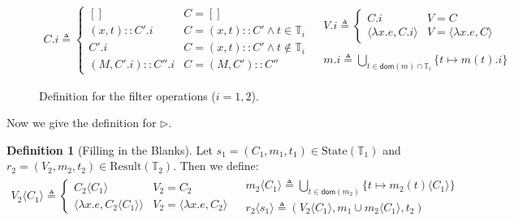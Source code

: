 \documentclass[acmsmall,review]{acmart}\settopmatter{printfolios=true,printccs=false,printacmref=false}
\theoremstyle{definition}
\newtheorem{definition}{Definition}[section]
\newcommand*{\cons}{::}
\newcommand*{\Time}{\mathbb{T}}
\newcommand*{\mem}{m}
\newcommand*{\State}{\text{State}}
\newcommand*{\Result}{\text{Result}}
\newcommand*{\inject}[2]{{#2}\langle{#1}\rangle}
\begin{document}
\begin{figure}[h!]
  \footnotesize
  \[
    \begin{array}{cc}
      C.i\triangleq
      \begin{cases}
        []                  & C=[]                                    \\
        (x,t)\cons C'.i     & C=(x,t)\cons C'\wedge t\in{\Time_i}     \\
        C'.i                & C=(x,t)\cons C'\wedge t\not\in{\Time_i} \\
        (M,C'.i)\cons C''.i & C=(M, C')\cons C''
      \end{cases} &
      \begin{array}{l}
        V.i\triangleq
        \begin{cases}
          C.i                           & V=C                           \\
          \langle\lambda x.e,C.i\rangle & V=\langle\lambda x.e,C\rangle
        \end{cases} \\ \\
        \mem.i\triangleq
        \displaystyle\bigcup_{t\in\mathsf{dom}(\mem)\cap\Time_i}\{t\mapsto \mem(t).i\}
      \end{array}
    \end{array}
  \]
  \caption{Definition for the filter operations ($i=1,2$).}
  \label{fig:concfilter}
\end{figure}

Now we give the definition for $\rhd$.
\begin{definition}[Filling in the Blanks]
  Let $s_1=(C_1,\mem_1,t_1)\in\State(\Time_1)$ and $r_2=(V_2,\mem_2,t_2)\in\Result(\Time_2)$. Then we define:
  \[
    \begin{array}{cc}
      \inject{C_1}{V_2}\triangleq
      \begin{cases}
        \inject{C_1}{C_2}                           & V_2=C_2                            \\
        \langle\lambda x.e,\inject{C_1}{C_2}\rangle & V_2=\langle\lambda x.e, C_2\rangle
      \end{cases} &
      \begin{array}{l}
        \inject{C_1}{\mem_2}\triangleq
        \displaystyle\bigcup_{t\in\mathsf{dom}(\mem_2)}\{t\mapsto\inject{C_1}{\mem_2(t)}\} \\
        \inject{s_1}{r_2}\triangleq
        (\inject{C_1}{V_2},\mem_1\cup\inject{C_1}{\mem_2},t_2)
      \end{array}
    \end{array}
  \]
\end{definition}
\end{document}
